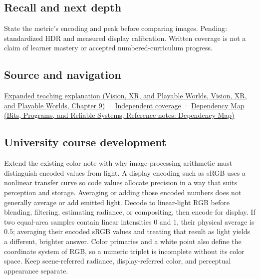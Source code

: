 \subsection{Recall and next depth}\label{appendix-a9f83ad40792-recall-and-next-depth}

State the metric's encoding and peak before comparing images. Pending: standardized HDR and measured display calibration. Written coverage is not a claim of learner mastery or accepted numbered-curriculum progress.

\subsection{Source and navigation}\label{appendix-a9f83ad40792-source-and-navigation}

\href{../07-Vision-XR-and-Playable-Worlds/main.pdf\#nameddest=04-visual-computing-ii-ch042-encoded-rgb-must-not-masquerade-as-linear-light}{Expanded teaching explanation (Vision, XR, and Playable Worlds, Vision, XR, and Playable Worlds, Chapter 9)} · \hyperref[appendix-fd090d982a15-xr01---independent-seeing-and-representation-source]{Independent coverage} · \href{../01-Bits-Programs-and-Reliable-Systems/main.pdf\#nameddest=appendix-4ad47bdd269a}{Dependency Map (Bits, Programs, and Reliable Systems, Reference notes: Dependency Map)}

\subsection{University course development}\label{appendix-a9f83ad40792-university-course-development}

Extend the existing color note with why image-processing arithmetic must distinguish encoded values from light. A display encoding such as sRGB uses a nonlinear transfer curve so code values allocate precision in a way that suits perception and storage. Averaging or adding those encoded numbers does not generally average or add emitted light. Decode to linear-light RGB before blending, filtering, estimating radiance, or compositing, then encode for display. If two equal-area samples contain linear intensities \(0\) and \(1\), their physical average is \(0.5\); averaging their encoded sRGB values and treating that result as light yields a different, brighter answer. Color primaries and a white point also define the coordinate system of RGB, so a numeric triplet is incomplete without its color space. Keep scene-referred radiance, display-referred color, and perceptual appearance separate.


